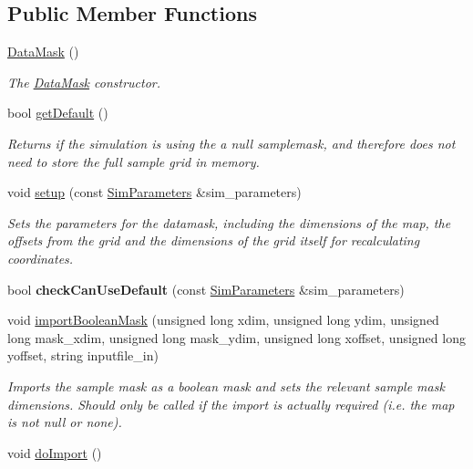 \subsection*{Public Member Functions}
\begin{DoxyCompactItemize}
\item 
\hyperlink{class_data_mask_ae89a953b8200f027d44dc74fa748852b}{Data\+Mask} ()
\begin{DoxyCompactList}\small\item\em The \hyperlink{class_data_mask}{Data\+Mask} constructor. \end{DoxyCompactList}\item 
bool \hyperlink{class_data_mask_a093364b6da9442f7c4945b5a06cfe3af}{get\+Default} ()
\begin{DoxyCompactList}\small\item\em Returns if the simulation is using the a null samplemask, and therefore does not need to store the full sample grid in memory. \end{DoxyCompactList}\item 
void \hyperlink{class_data_mask_ab6a4e6f63856f96805ddc79022c47104}{setup} (const \hyperlink{struct_sim_parameters}{Sim\+Parameters} \&sim\+\_\+parameters)
\begin{DoxyCompactList}\small\item\em Sets the parameters for the datamask, including the dimensions of the map, the offsets from the grid and the dimensions of the grid itself for recalculating coordinates. \end{DoxyCompactList}\item 
bool {\bfseries check\+Can\+Use\+Default} (const \hyperlink{struct_sim_parameters}{Sim\+Parameters} \&sim\+\_\+parameters)\hypertarget{class_data_mask_ae5bf5df7975431338e3ea757e6f2fac9}{}\label{class_data_mask_ae5bf5df7975431338e3ea757e6f2fac9}

\item 
void \hyperlink{class_data_mask_aac63b47c3688db359760f6134d30f239}{import\+Boolean\+Mask} (unsigned long xdim, unsigned long ydim, unsigned long mask\+\_\+xdim, unsigned long mask\+\_\+ydim, unsigned long xoffset, unsigned long yoffset, string inputfile\+\_\+in)
\begin{DoxyCompactList}\small\item\em Imports the sample mask as a boolean mask and sets the relevant sample mask dimensions. Should only be called if the import is actually required (i.\+e. the map is not null or none). \end{DoxyCompactList}\item 
void \hyperlink{class_data_mask_a85f7b85bb4ac54aa884a8a06f1d35d1b}{do\+Import} ()\hypertarget{class_data_mask_a85f7b85bb4ac54aa884a8a06f1d35d1b}{}\label{class_data_mask_a85f7b85bb4ac54aa884a8a06f1d35d1b}


\end{DoxyCompactItemize}

